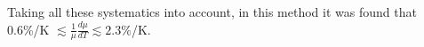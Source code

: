 Taking all these systematics into account, in this method it was found that 0.6\%/K
$\lesssim\frac{1}{\mu}\frac{d\mu}{dT}\lesssim 2.3\%$/K. 



